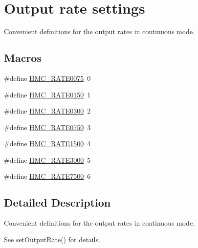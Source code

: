 \hypertarget{group___output_rates}{\section{Output rate settings}
\label{group___output_rates}
}


Convenient definitions for the output rates in continuous mode.  


\subsection*{Macros}
\begin{DoxyCompactItemize}
\item 
\#define \hyperlink{group___output_rates_ga7050ef98a3cf075fbcc636f99febf133}{H\+M\+C\+\_\+\+R\+A\+T\+E0075}~0
\item 
\#define \hyperlink{group___output_rates_gaf775ea794e046374c1f41cdf82094a3b}{H\+M\+C\+\_\+\+R\+A\+T\+E0150}~1
\item 
\#define \hyperlink{group___output_rates_gafe5cd1ea460af8dcb396f5e0b08a4b74}{H\+M\+C\+\_\+\+R\+A\+T\+E0300}~2
\item 
\#define \hyperlink{group___output_rates_ga492f058571ed55c31209a228c4bebfc3}{H\+M\+C\+\_\+\+R\+A\+T\+E0750}~3
\item 
\#define \hyperlink{group___output_rates_ga62ff19009f045af134f564d02cffd949}{H\+M\+C\+\_\+\+R\+A\+T\+E1500}~4
\item 
\#define \hyperlink{group___output_rates_gabbd5b14499978b6c734e8748dd85b225}{H\+M\+C\+\_\+\+R\+A\+T\+E3000}~5
\item 
\#define \hyperlink{group___output_rates_gaf1bf8b774c443c87d5609dcba5f690bf}{H\+M\+C\+\_\+\+R\+A\+T\+E7500}~6
\end{DoxyCompactItemize}


\subsection{Detailed Description}
Convenient definitions for the output rates in continuous mode. 

See {\ttfamily set\+Output\+Rate()} for details. 

